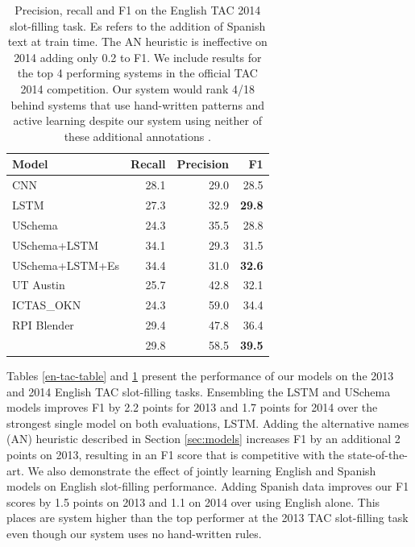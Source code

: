 \begin{table}[t!]
\begin{center}
\begin{tabular}{|lrrr|}
\hline
\bf Model & \bf Recall & \bf Precision & \bf F1 \\
\hline\hline
CNN                 & 28.1 & 29.0 & 28.5 \\
LSTM                & 27.3 & 32.9 & \bf 29.8  \\
USchema             & 24.3 & 35.5 & 28.8 \\
\hline\hline
USchema+LSTM        & 34.1 & 29.3 & 31.5 \\
USchema+LSTM+Es        & 34.4 & 31.0 & \bf 32.6 \\
\hline\hline
UT Austin & 25.7 & 42.8 & 32.1 \\
ICTAS\_OKN & 24.3 & 59.0 & 34.4 \\
RPI Blender & 29.4 & 47.8 & 36.4 \\
\citet{angeli2014stanford} & 29.8 & 58.5 & \bf 39.5 \\

\hline
\end{tabular}
\caption{Precision, recall and F1 on the English TAC 2014 slot-filling task. Es refers to the addition of Spanish text at train time. The AN heuristic is ineffective on 2014 adding only 0.2 to F1. We include results for the top 4 performing systems in the official TAC 2014 competition. Our system would rank 4/18 behind systems that use hand-written patterns and active learning despite our system using neither of these additional annotations \protect\citep{SurdeanuMihai2014}.\label{2014-en-tac-table}}
\end{center}
\end{table}

Tables \ref{en-tac-table} and \ref{2014-en-tac-table} present the performance of our models on the 2013 and 2014 English TAC slot-filling tasks. Ensembling the LSTM and USchema models improves F1 by 2.2 points for 2013 and 1.7 points for 2014 over the strongest single model on both evaluations, LSTM. Adding the alternative names (AN) heuristic described in Section \ref{sec:models} increases F1 by an additional 2 points on 2013, resulting in an F1 score that is competitive with the state-of-the-art. We also demonstrate the effect of jointly learning English and Spanish models on English slot-filling performance. Adding Spanish data improves our F1 scores by 1.5 points on 2013 and 1.1 on 2014 over using English alone. This places are system higher than the top performer at the 2013 TAC slot-filling task even though our system uses no hand-written rules.

